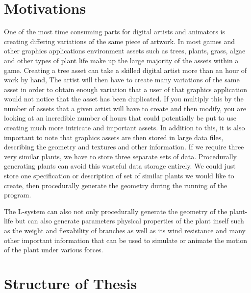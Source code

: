 \section{Motivations}
 
\begin{flushleft}

One of the most time consuming parts for digital artists and animators is creating differing variations of the same piece of artwork. In most games and other graphics applications environment assets such as trees, plants, grass, algae and other types of plant life make up the large majority of the assets within a game. Creating a tree asset can take a skilled digital artist more than an hour of work by hand, The artist will then have to create many variations of the same asset in order to obtain enough variation that a user of that graphics application would not notice that the asset has been duplicated. If you multiply this by the number of assets that a given artist will have to create and then modify, you are looking at an incredible number of hours that could potentially be put to use creating much more intricate and important assets. In addition to this, it is also important to note that graphics assets are then stored in large data files, describing the geometry and textures and other information. If we require three very similar plants, we have to store three separate sets of data. Procedurally generating plants can avoid this wasteful data storage entirely. We could just store one specification or description of set of similar plants we would like to create, then procedurally generate the geometry during the running of the program. \\

\vspace{5mm} 

The L-system can also not only procedurally generate the geometry of the plant-life but can also generate parameters physical properties of the plant inself such as the weight and flexability of branches as well as its wind resistance and many other important information that can be used to simulate or animate the motion of the plant under various forces. \\

\end{flushleft}

\section{Structure of Thesis}

